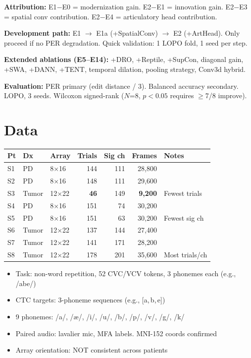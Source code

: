 \documentclass[11pt, letterpaper]{article}
\begin{document}
\textbf{Attribution:} E1$-$E0 = modernization gain. E2$-$E1 = innovation gain. E2$-$E3 = spatial conv contribution. E2$-$E4 = articulatory head contribution.

\textbf{Development path:} E1 $\to$ E1a (+SpatialConv) $\to$ E2 (+ArtHead). Only proceed if no PER degradation. Quick validation: 1 LOPO fold, 1 seed per step.

\textbf{Extended ablations (E5--E14):} +DRO, +Reptile, +SupCon, diagonal gain, +SWA, +DANN, +TENT, temporal dilation, pooling strategy, Conv3d hybrid.

\textbf{Evaluation:} PER primary (edit distance / 3). Balanced accuracy secondary. LOPO, 3 seeds. Wilcoxon signed-rank ($N$=8, $p<0.05$ requires $\geq$7/8 improve).


\section{Data}
\label{sec:data}

\begin{table}[h]
\centering\small
\begin{tabular}{@{}lllrrrl@{}}
\toprule
\textbf{Pt} & \textbf{Dx} & \textbf{Array} & \textbf{Trials} & \textbf{Sig ch} & \textbf{Frames} & \textbf{Notes} \\
\midrule
S1 & PD    & 8$\times$16  & 144 & 111 & 28{,}800 & \\
S2 & PD    & 8$\times$16  & 148 & 111 & 29{,}600 & \\
S3 & Tumor & 12$\times$22 & \textbf{46} & 149 & \textbf{9{,}200} & Fewest trials \\
S4 & PD    & 8$\times$16  & 151 & 74  & 30{,}200 & \\
S5 & PD    & 8$\times$16  & 151 & 63  & 30{,}200 & Fewest sig ch \\
S6 & Tumor & 12$\times$22 & 137 & 144 & 27{,}400 & \\
S7 & Tumor & 12$\times$22 & 141 & 171 & 28{,}200 & \\
S8 & Tumor & 12$\times$22 & 178 & 201 & 35{,}600 & Most trials/ch \\
\bottomrule
\end{tabular}
\end{table}

\begin{itemize}[nosep]
  \item Task: non-word repetition, 52 CVC/VCV tokens, 3 phonemes each (e.g., /abe/)
  \item CTC targets: 3-phoneme sequences (e.g., [a,\,b,\,e])
  \item 9 phonemes: /a/, /\ae/, /i/, /u/, /b/, /p/, /v/, /g/, /k/
  \item Paired audio: lavalier mic, MFA labels. MNI-152 coords confirmed
  \item Array orientation: NOT consistent across patients
\end{itemize}
\end{document}

